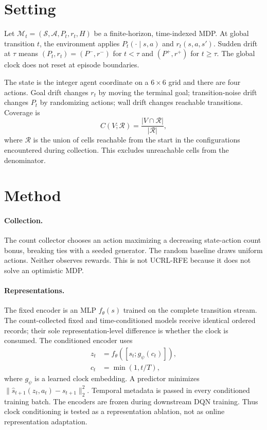 \documentclass[10pt]{article}
\begin{document}
\section{Setting}
Let $\mathcal{M}_t=(\mathcal{S},\mathcal{A},P_t,r_t,H)$ be a finite-horizon,
time-indexed MDP.  At global transition $t$, the environment applies
$P_t(\cdot\mid s,a)$ and $r_t(s,a,s')$.  Sudden drift at $\tau$ means
$(P_t,r_t)=(P^-,r^-)$ for $t<\tau$ and $(P^+,r^+)$ for $t\geq\tau$.
The global clock does not reset at episode boundaries.

The state is the integer agent coordinate on a $6\times6$ grid and there are
four actions.  Goal drift changes $r_t$ by moving the terminal goal;
transition-noise drift changes $P_t$ by randomizing actions; wall drift changes
reachable transitions.  Coverage is
\[
 C(V;\mathcal{R})=\frac{|V\cap\mathcal{R}|}{|\mathcal{R}|},
\]
where $\mathcal{R}$ is the union of cells reachable from the start in the
configurations encountered during collection.  This excludes unreachable
cells from the denominator.

\section{Method}
\paragraph{Collection.}
The count collector chooses an action maximizing a decreasing state-action
count bonus, breaking ties with a seeded generator.  The random baseline draws
uniform actions.  Neither observes rewards.  This is not UCRL-RFE because it
does not solve an optimistic MDP.

\paragraph{Representations.}
The fixed encoder is an MLP $f_\theta(s)$ trained on the complete transition
stream.  The count-collected fixed and time-conditioned models receive
identical ordered records; their sole representation-level difference is
whether the clock is consumed.
The conditioned encoder uses
\[
\begin{aligned}
z_t&=f_\theta\!\left([s_t;g_\psi(c_t)]\right),\\
c_t&=\min(1,t/T),
\end{aligned}
\]
where $g_\psi$ is a learned clock embedding.  A predictor minimizes
$\|\hat{s}_{t+1}(z_t,a_t)-s_{t+1}\|_2^2$.  Temporal metadata is passed in every
conditioned training batch.  The encoders are frozen during downstream DQN
training.  Thus clock conditioning is tested as a representation ablation,
not as online representation adaptation.
\end{document}
